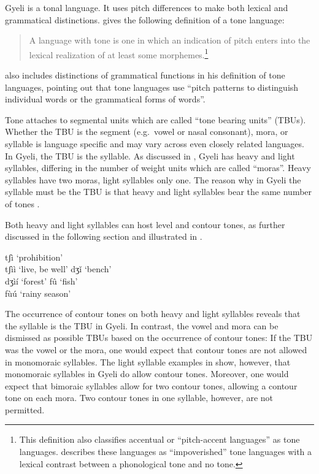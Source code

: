 Gyeli is a tonal language. It uses pitch differences to make both lexical and grammatical distinctions. \citet[4]{yip2002} gives the following definition of a tone language:
\begin{quote}
A language with tone is one in which an indication of pitch enters into the lexical realization of at least some morphemes.\footnote{This definition also classifies accentual or ``pitch-accent languages'' as tone languages. \citet[258]{yip2002} describes these languages as ``impoverished'' tone languages with a lexical contrast between a phonological tone and no tone.}
\end{quote}

\citet{maddieson2013} also includes distinctions of grammatical functions in his definition of tone languages, pointing out that tone languages use ``pitch patterns to distinguish individual words or the grammatical forms of words''.

Tone attaches to segmental units which are called ``tone bearing units'' (TBUs). Whether the TBU is the segment (e.g.\ vowel or nasal consonant), mora, or syllable is language specific and may vary across even closely related languages. In Gyeli, the TBU is the syllable. As discussed in , Gyeli has heavy and light syllables, differing in the number of weight units which are called ``moras''. Heavy syllables have two moras, light syllables only one. The reason why in Gyeli the syllable must be the TBU is that heavy and light syllables bear the same number of tones \citep[73]{yip2002}.

Both heavy and  light syllables can host level and contour tones, as further discussed in the following section and illustrated in .

\ea \label{syllTBU}
  \ea  tʃì  `prohibition' \\
      tʃìì `live, be well'
\ex dʒǐ `bench' \\
      dʒìí `forest'
\ex fû `fish' \\
      fùú `rainy season'
\z
\z


\noindent The occurrence of contour tones on both heavy and light syllables reveals that the syllable is the TBU in Gyeli. In contrast, the vowel and mora can be dismissed as possible TBUs based on the occurrence of contour tones: If the TBU was the vowel or the mora, one would expect that contour tones are not allowed in monomoraic syllables. The light syllable examples in  show, however, that monomoraic syllables in Gyeli do allow contour tones. Moreover, one would expect that bimoraic syllables allow for two contour tones, allowing a contour tone on each mora. Two contour tones in one syllable, however, are not permitted.

